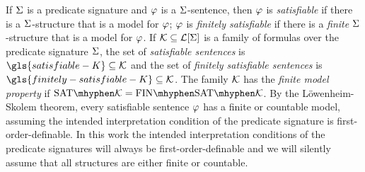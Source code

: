 
If $\mathrm{\Sigma}$ is a predicate signature and $\varphi$ is a $\mathrm{\Sigma}$-sentence, then
$\varphi$ is \emph{satisfiable} if there is a $\mathrm{\Sigma}$-structure that is a model
for $\varphi$; $\varphi$ is \emph{finitely satisfiable} if there is a \emph{finite}
$\mathrm{\Sigma}$-structure that is a model for $\varphi$.
If $\mathcal{K} \subseteq \mathcal{L}[\mathrm{\Sigma}]$ is a family of formulas
over the predicate signature $\mathrm{\Sigma}$, the set of \emph{satisfiable sentences} is
$\gls{satisfiable-K} \subseteq \classFK$ and the set of \emph{finitely
satisfiable sentences} is $\gls{finitely-satisfiable-K} \subseteq \classFK$.
The family $\mathcal{K}$ has the \emph{finite model property} if $\Sat\classFK =
\FinSat\classFK$. By the L\"owenheim-Skolem theorem, every satisfiable sentence 
$\varphi$ has a finite or countable model, assuming the intended interpretation
condition of the predicate signature is first-order-definable.
In this work the intended interpretation conditions of the predicate signatures
will always be first-order-definable and we will silently assume that all
structures are either finite or countable.
